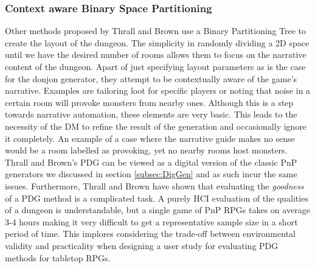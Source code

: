 \documentclass{UoYCSproject}
\begin{document}
\subsubsection{Context aware Binary Space Partitioning}
\label{subsub:BSP}
Other methods proposed by Thrall \parencite{Thrall} and Brown \parencite{Brown} use a Binary Partitioning Tree \parencite{BSP} to create the layout of the dungeon. The simplicity in randomly dividing a 2D space until we have the desired number of rooms allows them to focus on the narrative content of the dungeon. Apart of just specifying layout parameters as is the case for the donjon generator, they attempt to be contextually aware of the game's narrative. Examples are tailoring loot for specific players or noting that noise in a certain room will provoke monsters from nearby ones. Although this is a step towards narrative automation, these elements are very basic. This leads to the necessity of the DM to refine the result of the generation and occasionally ignore it completely. An example of a case where the narrative guide makes no sense would be a room labelled as provoking, yet no nearby rooms host monsters. Thrall and Brown's PDG can be viewed as a digital version of the classic PnP generators we discussed in section \ref{subsec:DigGen} and as such incur the same issues. Furthermore, Thrall and Brown have shown that evaluating the \textit{goodness} of a PDG method is a complicated task. A purely HCI evaluation of the qualities of a dungeon is understandable, but a single game of PnP RPGs takes on average 3-4 hours \parencite{gameSessionLengthPoll} making it very difficult to get a representative sample size in a short period of time. This implores considering the trade-off between environmental validity and practicality when designing a user study for evaluating PDG methods for tabletop RPGs.
\end{document}
